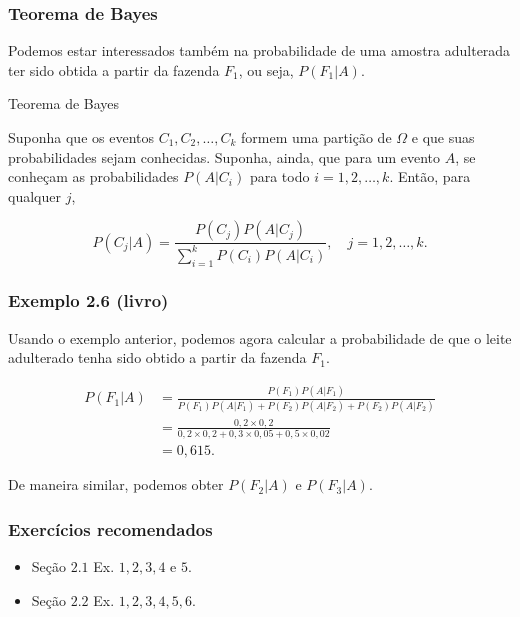 \documentclass[11pt]{beamer}
\begin{document}
\begin{frame}
\frametitle{Teorema de Bayes}

Podemos estar interessados também na probabilidade de uma amostra
adulterada ter sido obtida a partir da fazenda \(F_1\), ou seja,
\(P(F_1|A)\).
\begin{alertblock}{Teorema de Bayes}

Suponha que os eventos \(C_1, C_2, \ldots, C_k\) formem uma partição de
\(\Omega\) e que suas probabilidades sejam conhecidas. Suponha, ainda,
que para um evento \(A\), se conheçam as probabilidades \(P(A | C_i)\)
para todo \(i = 1, 2, \ldots, k.\) Então, para qualquer \(j\),

\[
P(C_j | A ) = \frac{P(C_j)P(A | C_j)}{\sum_{i=1}^k P(C_i)P(A | C_i)},
\quad j = 1,2, \ldots,k.
\]
\end{alertblock}
\end{frame}

\begin{frame}
\frametitle{Exemplo 2.6 (livro)}

Usando o exemplo anterior, podemos agora calcular a probabilidade de que
o leite adulterado tenha sido obtido a partir da fazenda \(F_1\).

\begin{align*}
P(F_1|A) &= \frac{P(F_1)P(A|F_1)}
{P(F_1)P(A|F_1) + P(F_2)P(A|F_2) + P(F_2)P(A|F_2)} \\
  &= \frac{0,2 \times 0,2}
{0,2 \times 0,2 + 0,3 \times 0,05 + 0,5 \times 0,02} \\
  &= 0,615.
\end{align*}

De maneira similar, podemos obter \(P(F_2|A)\) e \(P(F_3|A)\).
\end{frame}

\begin{frame}
\frametitle{Exercícios recomendados}

\begin{itemize}
\item
  Seção \(2.1\) Ex. \(1, 2, 3, 4\) e \(5\).
\item
  Seção \(2.2\) Ex. \(1, 2, 3, 4, 5, 6\).
\end{itemize}
\end{frame}
\end{document}
